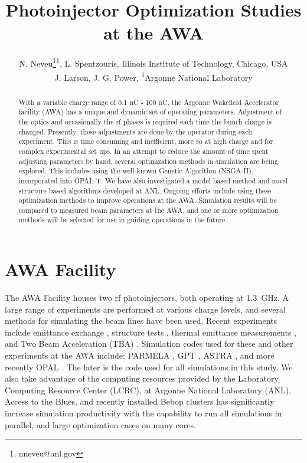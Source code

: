 \documentclass[letterpaper,  %
              ]{jacow-2_3}   %
\begin{document}
\title{Photoinjector Optimization Studies at the AWA}

\author{N. Neveu\thanks{nneveu@anl.gov}\textsuperscript{1}, 
	    L. Spentzouris, Illinois Institute of Technology, Chicago, USA \\
	    J. Larson, J. G. Power, \textsuperscript{1}Argonne National Laboratory}
\maketitle

%
\begin{abstract}
With a variable charge range of 0.1 nC - 100 nC, 
the Argonne Wakefield Accelerator facility (AWA) 
has a unique and dynamic set of operating parameters. 
Adjustment of the optics and occasionally the rf phases is 
required each time the bunch charge is changed. 
Presently, these adjustments are done by the operator during each experiment. 
This is time consuming and inefficient, more so at high charge and for complex experimental set ups.
In an attempt to reduce the amount of time spent adjusting parameters by hand, 
several optimization methods in simulation are being explored. 
This includes using the well-known Genetic Algorithm (NSGA-II),
incorporated into OPAL-T. 
We have also investigated a model-based method and novel
structure based algorithms developed at ANL. 
Ongoing efforts include using these optimization methods to improve operations at the AWA. 
Simulation results will be compared to measured beam parameters at the AWA, 
and one or more optimization methods will be selected for use in guiding operations in the future.
\end{abstract}


\section{AWA Facility}
The AWA Facility houses two rf photoinjectors, both 
operating at \SI{1.3}{GHz}. 
A large range of experiments are performed at various 
charge levels, and several methods for simulating 
the beam lines have been used.
Recent experiments include emittance exchange \cite{eex}, 
structure tests \cite{pets}, thermal emittance measurements \cite{therm}, 
and Two Beam Acceleration (TBA) \cite{tba}. 
Simulation codes used for these and other experiments at
the AWA include: PARMELA \cite{parmela}, GPT \cite{gpt}, 
ASTRA \cite{astra}, and more recently OPAL \cite{opal}. 
The later is the code used for all simulations in this 
study. 
We also take advantage of the computing resources provided
by the Laboratory Computing Resource Center (LCRC), 
at Argonne National Laboratory (ANL). Access to the 
Blues, and recently installed Bebop clusters has significantly
increase simulation productivity with the capability to run 
all simulations in parallel, and large optimization cases
on many cores.
\end{document}
